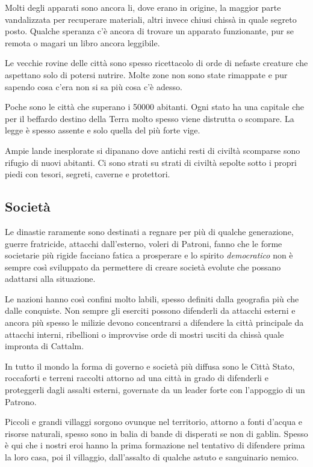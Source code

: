 \begin{multicols}{2}
Molti degli apparati sono ancora li, dove erano in origine, la maggior parte vandalizzata per recuperare materiali, altri invece chiusi chissà in quale segreto posto. Qualche speranza c'è ancora di trovare un apparato funzionante, pur se remota o magari un libro ancora leggibile.

Le vecchie rovine delle città sono spesso ricettacolo di orde di nefaste creature che aspettano solo di potersi nutrire. Molte zone non sono state rimappate e pur sapendo cosa c'era non si sa più cosa c'è adesso.

Poche sono le città che superano i 50000 abitanti. Ogni stato ha una capitale che per il beffardo destino della Terra molto spesso viene distrutta o scompare. La legge è spesso assente e solo quella del più forte vige.

Ampie lande inesplorate si dipanano dove antichi resti di civiltà scomparse sono rifugio di nuovi abitanti. Ci sono strati su strati di civiltà sepolte sotto i propri piedi con tesori, segreti, caverne e protettori.

\subsection{Società}\label{societasullaterra}

Le dinastie raramente sono destinati a regnare per più di qualche generazione, guerre fratricide, attacchi dall'esterno, voleri di Patroni, fanno che le forme societarie più rigide facciano fatica a prosperare e lo spirito \emph{democratico} non è sempre così sviluppato da permettere di creare società evolute che possano adattarsi alla situazione.

Le nazioni hanno così confini molto labili, spesso definiti dalla geografia più che dalle conquiste. Non sempre gli eserciti possono difenderli da attacchi esterni e ancora più spesso le milizie devono concentrarsi a difendere la città principale da attacchi interni, ribellioni o improvvise orde di mostri usciti da chissà quale impronta di Cattalm.

In tutto il mondo la forma di governo e società più diffusa sono le Città Stato, roccaforti e terreni raccolti attorno ad una città in grado di difenderli e proteggerli dagli assalti esterni, governate da un leader forte con l'appoggio di un Patrono.

Piccoli e grandi villaggi sorgono ovunque nel territorio, attorno a fonti d'acqua e risorse naturali, spesso sono in balia di bande di disperati se non di gablin.
Spesso è qui che i nostri eroi hanno la prima formazione nel tentativo di difendere prima la loro casa, poi il villaggio, dall'assalto di qualche astuto e sanguinario nemico.


\end{multicols}
